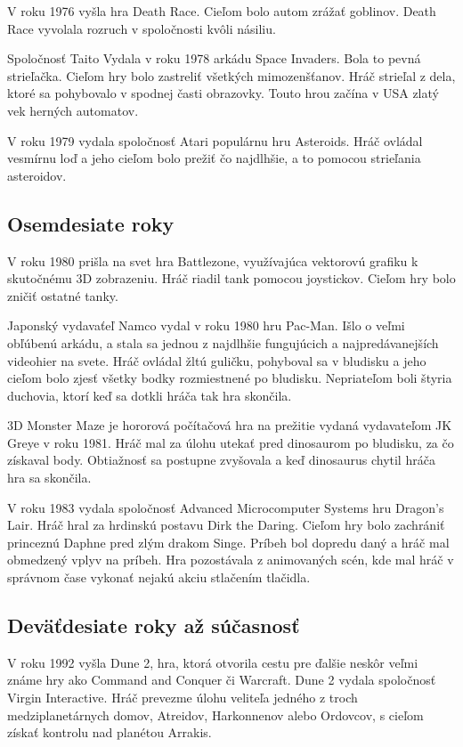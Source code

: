 \documentclass[10pt,oneside,slovak,a4paper]{article}
\begin{document}
V roku 1976 vyšla hra Death Race. Cieľom bolo autom zrážať goblinov. Death Race vyvolala rozruch v spoločnosti kvôli násiliu.

Spoločnosť Taito Vydala v roku 1978 arkádu Space Invaders. Bola to pevná strieľačka. Cieľom hry bolo zastreliť všetkých mimozenšťanov. Hráč strieľal z dela, ktoré sa pohybovalo v spodnej časti obrazovky. Touto hrou začína v USA zlatý vek herných automatov.

V roku 1979 vydala spoločnosť Atari populárnu hru Asteroids. Hráč ovládal vesmírnu loď a jeho cieľom bolo prežiť čo najdlhšie, a to pomocou strieľania asteroidov.



\subsection{Osemdesiate roky} \label{osemdesiate}
V roku 1980 prišla na svet hra Battlezone, využívajúca vektorovú grafiku k skutočnému 3D zobrazeniu. Hráč riadil tank pomocou joystickov. Cieľom hry bolo zničiť ostatné tanky.

Japonský vydavaťeľ Namco vydal v roku 1980 hru Pac-Man. Išlo o veľmi obľúbenú arkádu, a stala sa jednou z najdlhšie fungujúcich a najpredávanejších videohier na svete. Hráč ovládal žltú guličku, pohyboval sa v bludisku a jeho cieľom bolo zjesť všetky bodky rozmiestnené po bludisku. Nepriateľom boli štyria duchovia, ktorí keď sa dotkli hráča tak hra skončila.

3D Monster Maze je hororová počítačová hra na prežitie vydaná vydavateľom JK Greye v roku 1981. Hráč mal za úlohu utekať pred dinosaurom po bludisku, za čo získaval body. Obtiažnosť sa postupne zvyšovala a keď dinosaurus chytil hráča hra sa skončila.

V roku 1983 vydala spoločnosť Advanced Microcomputer Systems hru Dragon's Lair. Hráč hral za hrdinskú postavu Dirk the Daring. Cieľom hry bolo zachrániť princeznú Daphne pred zlým drakom Singe. Príbeh bol dopredu daný a hráč mal obmedzený vplyv na príbeh. Hra pozostávala z animovaných scén, kde mal hráč v správnom čase vykonať nejakú akciu stlačením tlačidla.

\subsection{Deväťdesiate roky až súčasnosť} \label{devatdesiate}
V roku 1992 vyšla Dune 2, hra, ktorá otvorila cestu pre ďalšie neskôr veľmi známe hry ako Command and Conquer či Warcraft. Dune 2 vydala spoločnosť Virgin Interactive. Hráč prevezme úlohu veliteľa jedného z troch medziplanetárnych domov, Atreidov, Harkonnenov alebo Ordovcov, s cieľom získať kontrolu nad planétou Arrakis.
\end{document}
